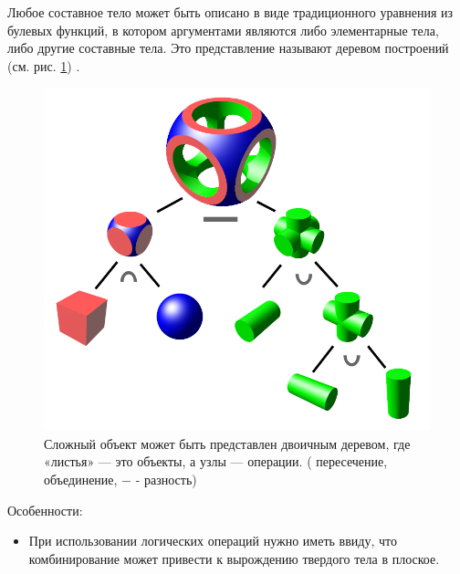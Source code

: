 Любое составное тело может быть описано в виде традиционного уравнения из булевых функций,
в котором аргументами являются либо элементарные тела, либо другие составные тела.
Это представление называют деревом построений (см. рис. \ref{fig:csg_tree}) \cite{main_modeling}.
\clearpage
\begin{figure}
  \centering
  \includegraphics[scale=0.3]{inc/img/csg_tree}
  \caption{Сложный объект может быть представлен двоичным деревом, 
  где «листья» — это объекты, а узлы — операции. 
  ( пересечение, объединение, −  - разность)}
  \label{fig:csg_tree}
\end{figure}

Особенности:  
\begin{itemize}
  \item При использовании логических операций нужно иметь ввиду, что комбинирование может привести к вырождению твердого тела в плоское. 
\end{itemize}
